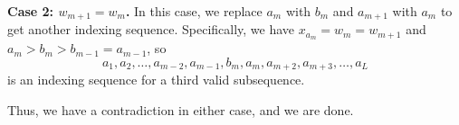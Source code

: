 \documentclass{scrartcl}
\begin{document}
\textbf{Case 2: $w_{m+1} = w_m$.} In this case, we replace $a_m$ with $b_m$ and $a_{m+1}$ with $a_m$ to get another indexing sequence.
Specifically, we have $x_{a_m} = w_m = w_{m+1}$ and $a_m > b_m > b_{m-1} = a_{m-1}$, so
\[ a_1, a_2, \dots, a_{m-2}, a_{m-1}, b_m, a_m, a_{m+2}, a_{m+3}, \dots, a_L \]
is an indexing sequence for a third valid subsequence.

Thus, we have a contradiction in either case, and we are done.
\end{document}
